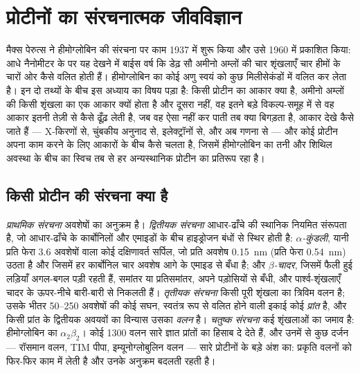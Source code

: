 \chapter{प्रोटीनों का संरचनात्मक जीवविज्ञान}\label{ch:b3:structural-biology}

मैक्स पेरुत्स ने हीमोग्लोबिन की संरचना पर काम 1937 में शुरू किया और उसे
1960 में प्रकाशित किया: आधे नैनोमीटर के  पर यह देखने में बाईस
वर्ष कि डेढ़ सौ अमीनो अम्लों की चार शृंखलाएँ चार हीमों के चारों ओर कैसे
वलित होती हैं। हीमोग्लोबिन का कोई अणु स्वयं को कुछ मिलीसेकंडों में
वलित कर लेता है। इन दो तथ्यों के बीच इस अध्याय का विषय पड़ा है: किसी
प्रोटीन का आकार क्या है, अमीनो अम्लों की किसी शृंखला का एक आकार क्यों
होता है और दूसरा नहीं, वह इतने बड़े विकल्प-समूह में से वह आकार इतनी
तेज़ी से कैसे ढूँढ़ लेती है, जब वह ऐसा नहीं कर पाती तब क्या बिगड़ता है,
आकार देखे कैसे जाते हैं --- X-किरणों से, चुंबकीय अनुनाद से,
इलेक्ट्रॉनों से, और अब गणना से --- और कोई प्रोटीन अपना काम करने के लिए
आकारों के बीच कैसे चलता है, जिसमें हीमोग्लोबिन का तनी और शिथिल अवस्था
के बीच का स्विच तब से हर अन्यस्थानिक प्रोटीन का प्रतिरूप रहा है।

\section{किसी प्रोटीन की संरचना क्या है}

\begin{definition}[संरचना के स्तर]\label{def:b3:structural-biology:levels}
\emph{प्राथमिक संरचना} अवशेषों का अनुक्रम है। \emph{द्वितीयक संरचना}
आधार-ढाँचे की स्थानिक नियमित संरूपता है, जो आधार-ढाँचे के कार्बोनिलों
और एमाइडों के बीच हाइड्रोजन बंधों से स्थिर होती है:
\emph{$\alpha$-कुंडली}, यानी प्रति फेरा $3.6$ अवशेषों वाला कोई
दक्षिणावर्त सर्पिल, जो प्रति अवशेष \qty{0.15}{nm} (प्रति फेरा
\qty{0.54}{nm}) उठता है और जिसमें हर कार्बोनिल चार अवशेष आगे के एमाइड
से बँधा है; और \emph{$\beta$-चादर}, जिसमें फैली हुई लड़ियाँ अगल-बगल
पड़ी रहती हैं, समांतर या प्रतिसमांतर, अपने पड़ोसियों से बँधी, और
पार्श्व-शृंखलाएँ चादर के ऊपर-नीचे बारी-बारी से निकलती हैं।
\emph{तृतीयक संरचना} किसी पूरी शृंखला का त्रिविम वलन है; उसके भीतर
\numrange{50}{250} अवशेषों की कोई सघन, स्वतंत्र रूप से वलित होने वाली
इकाई कोई \emph{प्रांत} है, और किसी प्रांत के द्वितीयक अवयवों का विन्यास
उसका \emph{वलन} है। \emph{चतुष्क संरचना} कई शृंखलाओं का जमाव है:
हीमोग्लोबिन का $\alpha_{2}\beta_{2}$। कोई \num{1300} वलन सारे ज्ञात
प्रांतों का हिसाब दे देते हैं, और उनमें से कुछ दर्जन --- रॉसमान वलन,
TIM पीपा, इम्यूनोग्लोबुलिन वलन --- सारे प्रोटीनों के बड़े अंश का:
प्रकृति वलनों को फिर-फिर काम में लेती है और उनके अनुक्रम बदलती रहती है।
\end{definition}

